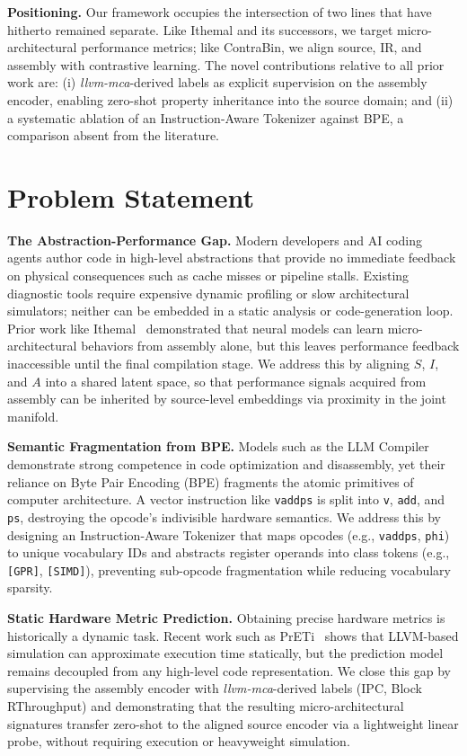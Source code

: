 \documentclass[11pt]{article}
\begin{document}
\textbf{Positioning.} Our framework occupies the intersection of two lines that have hitherto remained separate. Like Ithemal and its successors, we target micro-architectural performance metrics; like ContraBin, we align source, IR, and assembly with contrastive learning. The novel contributions relative to all prior work are: (i) \emph{llvm-mca}-derived labels as explicit supervision on the assembly encoder, enabling zero-shot property inheritance into the source domain; and (ii) a systematic ablation of an Instruction-Aware Tokenizer against BPE, a comparison absent from the literature.

\section{Problem Statement}

\noindent\textbf{The Abstraction-Performance Gap.} Modern developers and AI coding agents author code in high-level abstractions that provide no immediate feedback on physical consequences such as cache misses or pipeline stalls. Existing diagnostic tools require expensive dynamic profiling or slow architectural simulators; neither can be embedded in a static analysis or code-generation loop. Prior work like Ithemal~\cite{mendis2019ithemal} demonstrated that neural models can learn micro-architectural behaviors from assembly alone, but this leaves performance feedback inaccessible until the final compilation stage. We address this by aligning $S$, $I$, and $A$ into a shared latent space, so that performance signals acquired from assembly can be inherited by source-level embeddings via proximity in the joint manifold.

\noindent\textbf{Semantic Fragmentation from BPE.} Models such as the LLM Compiler~\cite{cummins2025llm} demonstrate strong competence in code optimization and disassembly, yet their reliance on Byte Pair Encoding (BPE) fragments the atomic primitives of computer architecture. A vector instruction like \texttt{vaddps} is split into \texttt{v}, \texttt{add}, and \texttt{ps}, destroying the opcode's indivisible hardware semantics. We address this by designing an Instruction-Aware Tokenizer that maps opcodes (e.g., \texttt{vaddps}, \texttt{phi}) to unique vocabulary IDs and abstracts register operands into class tokens (e.g., \texttt{[GPR]}, \texttt{[SIMD]}), preventing sub-opcode fragmentation while reducing vocabulary sparsity.

\noindent\textbf{Static Hardware Metric Prediction.} Obtaining precise hardware metrics is historically a dynamic task. Recent work such as PrETi~\cite{xu2025preti} shows that LLVM-based simulation can approximate execution time statically, but the prediction model remains decoupled from any high-level code representation. We close this gap by supervising the assembly encoder with \textit{llvm-mca}-derived labels (IPC, Block RThroughput) and demonstrating that the resulting micro-architectural signatures transfer zero-shot to the aligned source encoder via a lightweight linear probe, without requiring execution or heavyweight simulation.
\end{document}
